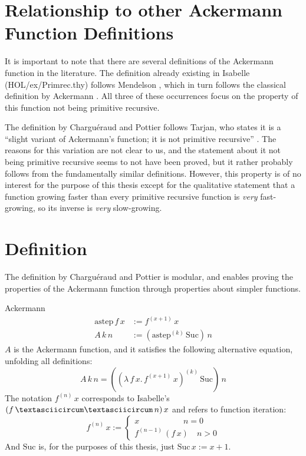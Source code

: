 \documentclass[headsepline,footsepline,footinclude=false,oneside,fontsize=11pt,paper=a4,listof=totoc,bibliography=totoc]{scrbook} %
\begin{document}
\section{Relationship to other Ackermann Function Definitions}

It is important to note that there are several definitions of the Ackermann function in the literature. The definition already existing in Isabelle (HOL/ex/Primrec.thy) follows Mendelson \cite[pg. 345]{Mendelson09}, which in turn follows the classical definition by Ackermann \cite{Ackermann22}. All three of these occurrences focus on the property of this function not being primitive recursive.

The definition by Charguéraud and Pottier follows Tarjan, who states it is a ``slight variant of Ackermann's function; it is not primitive recursive'' \cite{Tarjan1975b}. The reasons for this variation are not clear to us, and the statement about it not being primitive recursive seems to not have been proved, but it rather probably follows from the fundamentally similar definitions.
However, this property is of no interest for the purpose of this thesis except for the qualitative statement that a function growing faster than every primitive recursive function is \textit{very} fast-growing, so its inverse is \textit{very} slow-growing.

\section{Definition}

The definition by Charguéraud and Pottier is modular, and enables proving the properties of the Ackermann function through properties about simpler functions.


\begin{definition}{Ackermann}
	\begin{align}
	\mathrm{astep} \, f \, x &:= f^{(x+1)} \, x \\
	A \, k \, n &:= (\mathrm{astep}^{(k)} \, \mathrm{Suc}) \, n
	\end{align}
	$A$ is the Ackermann function, and it satisfies the following alternative equation, unfolding all definitions:
	\begin{equation}
	A \, k \, n = ((\lambda \, f \, x. \, f ^ {(x + 1)}\, x) ^ {(k)} \, \mathrm{Suc}) \, n
	\end{equation}
	The notation $f ^{(n)} \, x$ corresponds to Isabelle's $(f \, \textasciicircum \textasciicircum \, n) \, x$ and refers to function iteration:
	\begin{equation}
	f^{(n)} \, x := \begin{cases}
					x \quad \quad \quad \quad \quad \, \, n = 0 \\
					f^{(n-1)} \, (f \, x) \quad n > 0
					\end{cases}
	\end{equation}
	And $\mathrm{Suc}$ is, for the purposes of this thesis, just $\mathrm{Suc}\,x := x + 1$.
\end{definition}
\end{document}
